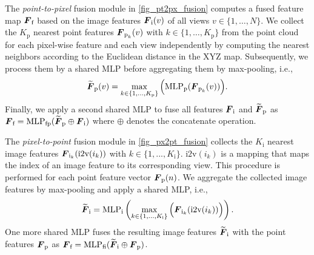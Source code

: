 The \emph{point-to-pixel} fusion module in \cref{fig_pt2px_fusion} computes a 
fused feature map $\boldsymbol F_\text{f}$ based on the image features $\boldsymbol F_{\text{i}}(v)$ of all views $v \in \{1, \ldots, N\}$.
We collect the $K_\text{p}$ nearest point features $\boldsymbol F_{\text{p}_k}(v)$ with $k \in \{1, \ldots, K_\text{p}\}$ from the point cloud for each pixel-wise feature and each view independently by computing the nearest neighbors according to the Euclidean distance in the XYZ map. Subsequently, we process them by a shared MLP before aggregating them by max-pooling, i.e.,
\begin{align} 
    \widetilde{\boldsymbol F}_{\text{p}}(v) = \max_{k \in \{1, \ldots, K_\text{p}\}} 
    \Big( \text{MLP}_\text{p}(\boldsymbol F_{\text{p}_k}(v)) \Big).
    \label{eq_p2r}
\end{align}
Finally, we apply a second shared MLP to fuse all features $\boldsymbol F_\text{i}$ and 
$\widetilde{\boldsymbol F}_{\text{p}}$ as 
$\boldsymbol F_{\text{f}} = \text{MLP}_\text{fp}(\widetilde{\boldsymbol F}_{\text{p}} \oplus \boldsymbol F_\text{i})$ where $\oplus$ denotes the concatenate operation.


The \emph{pixel-to-point} fusion module in \cref{fig_px2pt_fusion} collects the $K_\text{i}$ nearest image features $\boldsymbol F_{\text{i}_k}(\textrm{i2v}(i_k))$ with $k\in\{1, ..., K_\text{i}\}$. $\textrm{i2v}(i_k)$ is a mapping that maps the index of an image feature to its corresponding view. This procedure is performed for each point feature vector $\boldsymbol F_\text{p}(n)$.
We aggregate the collected image features by max-pooling and apply a shared MLP, i.e.,
\begin{align}
    \widetilde{\boldsymbol F}_{\text{i}} = \text{MLP}_\text{i} 
    \left( \max_{k \in \{1, \ldots, K_\text{i}\}} 
    \Big( \boldsymbol F_{\text{i}_k}(\textrm{i2v}(i_k)) \Big)  
    \right).
    \label{eq_r2p}
\end{align}
One more shared MLP fuses the resulting image features $\widetilde{\boldsymbol F}_{\text{i}}$ with the point features $\boldsymbol F_\text{p}$ as 
$\boldsymbol F_{\text{f}} = \text{MLP}_\text{fi}(\widetilde{\boldsymbol F}_{\text{i}} \oplus \boldsymbol F_\text{p})$.




